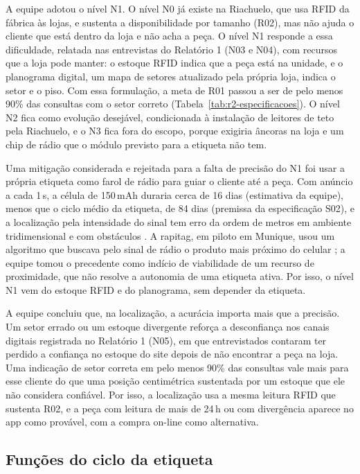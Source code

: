 A equipe adotou o nível N1. O nível N0 já existe na Riachuelo, que usa RFID da fábrica às lojas, e sustenta a disponibilidade por tamanho (R02), mas não ajuda o cliente que está dentro da loja e não acha a peça. O nível N1 responde a essa dificuldade, relatada nas entrevistas do Relatório 1 (N03 e N04), com recursos que a loja pode manter: o estoque RFID indica que a peça está na unidade, e o planograma digital, um mapa de setores atualizado pela própria loja, indica o setor e o piso. Com essa formulação, a meta de R01 passou a ser de pelo menos 90\% das consultas com o setor correto (Tabela~\ref{tab:r2-especificacoes}). O nível N2 fica como evolução desejável, condicionada à instalação de leitores de teto pela Riachuelo, e o N3 fica fora do escopo, porque exigiria âncoras na loja e um chip de rádio que o módulo previsto para a etiqueta não tem.

Uma mitigação considerada e rejeitada para a falta de precisão do N1 foi usar a própria etiqueta como farol de rádio para guiar o cliente até a peça. Com anúncio a cada 1\,s, a célula de 150\,mAh duraria cerca de 16 dias (estimativa da equipe), menos que o ciclo médio da etiqueta, de 84 dias (premissa da especificação S02), e a localização pela intensidade do sinal tem erro da ordem de metros em ambiente tridimensional e com obstáculos \cite{ramirez2021ble, fira2026uwb}. A rapitag, em piloto em Munique, usou um algoritmo que buscava pelo sinal de rádio o produto mais próximo do celular \cite{storesshops2019rapitag}; a equipe tomou o precedente como indício de viabilidade de um recurso de proximidade, que não resolve a autonomia de uma etiqueta ativa. Por isso, o nível N1 vem do estoque RFID e do planograma, sem depender da etiqueta.

A equipe concluiu que, na localização, a acurácia importa mais que a precisão. Um setor errado ou um estoque divergente reforça a desconfiança nos canais digitais registrada no Relatório 1 (N05), em que entrevistados contaram ter perdido a confiança no estoque do site depois de não encontrar a peça na loja. Uma indicação de setor correta em pelo menos 90\% das consultas vale mais para esse cliente do que uma posição centimétrica sustentada por um estoque que ele não considera confiável. Por isso, a localização usa a mesma leitura RFID que sustenta R02, e a peça com leitura de mais de 24\,h ou com divergência aparece no app como provável, com a compra on-line como alternativa.

\subsection{Funções do ciclo da etiqueta}
\label{sub:r2-funcoes-ciclo}

